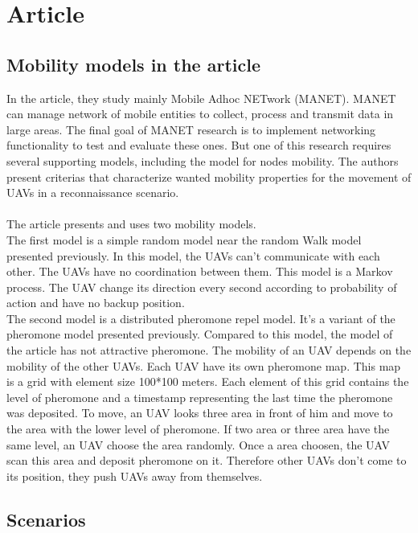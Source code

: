 \part{Article}

\setcounter{chapter}{0}

\chapter{Mobility models in the article}

In the article, they study mainly Mobile Adhoc NETwork (MANET). MANET can manage network of mobile entities to collect, process and transmit data in large areas. The final goal of MANET research is to implement networking functionality to test and evaluate these ones. But one of this research requires several supporting models, including the model for nodes mobility. The authors present criterias that characterize wanted mobility properties for the movement of UAVs in a reconnaissance scenario. \\\\

The article presents and uses two mobility models.\\
The first model is a simple random model near the random Walk model presented previously. In this model, the UAVs can't communicate with each other. The UAVs have no coordination between them. This model is a Markov process. The UAV change its direction every second according to probability of action and have no backup position.\\

The second model is a distributed pheromone repel model. It's a variant of the pheromone model presented previously. Compared to this model, the model of the article has not attractive pheromone. The mobility of an UAV depends on the mobility of the other UAVs. Each UAV have its own pheromone map. This map is a grid with element size 100*100 meters. Each element of this grid contains the level of pheromone and a timestamp representing the last time the pheromone was deposited. To move, an UAV looks three area in front of him and move to the area with the lower level of pheromone. If two area or three area have the same level, an UAV choose the area randomly. Once a area choosen, the UAV scan this area and deposit pheromone on it. Therefore other UAVs don't come to its position, they push UAVs away from themselves.

\chapter{Scenarios}

